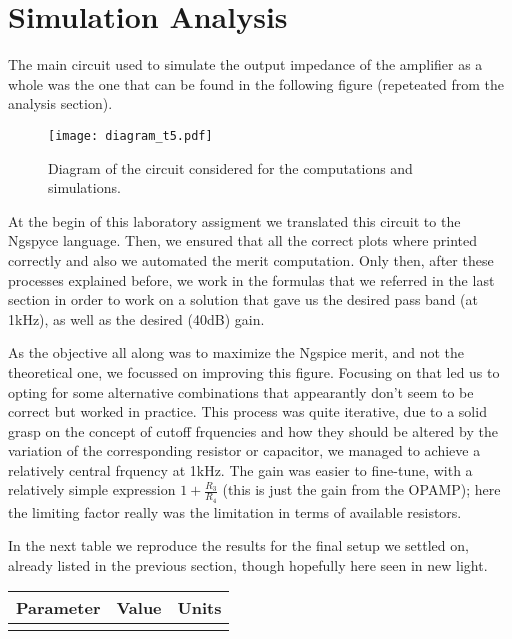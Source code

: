 \section{Simulation Analysis}
\label{sec:simulation}

The main circuit used to simulate the output impedance of the amplifier as a whole was the one that can be found in the following figure (repeteated from the analysis section).

\begin{figure}[h] \centering
\texttt{[image: diagram\_t5.pdf]}
\caption{Diagram of the circuit considered for the computations and simulations.}
\label{fig:diagram_t5_2}
\end{figure}

At the begin of this laboratory assigment we translated this circuit to the Ngspyce language. Then, we ensured that all the correct plots where printed correctly and also we automated the merit computation. Only then, after these processes explained before, we work in the formulas that we referred in the last section in order to work on a solution that gave us the desired pass band (at 1kHz), as well as the desired (40dB) gain. 

As the objective all along was to maximize the Ngspice merit, and not the theoretical one, we focussed on improving this figure. Focusing on that led us to opting for some alternative combinations that appearantly don't seem to be correct but worked in practice. This process was quite iterative, due to a solid grasp on the concept of cutoff frquencies and how they should be altered by the variation of the corresponding resistor or capacitor, we managed to achieve a relatively central frquency at 1kHz. The gain was easier to fine-tune, with a relatively simple expression $1+\frac{R_3}{R_4}$ (this is just the gain from the OPAMP); here the limiting factor really was the limitation in terms of available resistors.

In the next table we reproduce the results for the final setup we settled on, already listed in the previous section, though hopefully here seen in new light. 


\hfill
 \parbox{1\linewidth}{
  \centering
  \begin{tabular}{|l|l|r|}
    \hline    
    {\bf Parameter} & {\bf Value} & {\bf Units }\\ \hline
    
  \label{tab:params2}
  \end{tabular}
  }
\par

